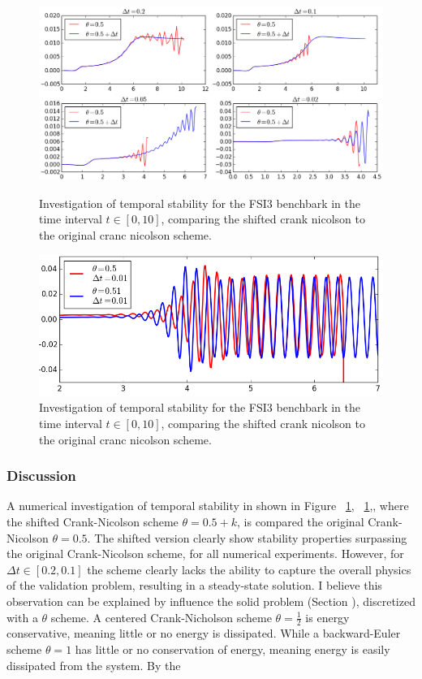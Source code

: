 \begin{figure}[h!]
 	\centering
    \includegraphics[scale=0.6]{./Fig/thetacheck.png} \\
      \caption{Investigation of temporal stability for the FSI3 benchbark in the time interval $t \in [0, 10]$, comparing the shifted crank nicolson to the original cranc nicolson scheme. }
\label{fig:cncomp1}
\end{figure}

\newpage

\begin{figure}[h!]
 	\centering
    \includegraphics[scale=0.6]{./Fig/besttheta.png}
      \caption{Investigation of temporal stability for the FSI3 benchbark in the time interval $t \in [0, 10]$, comparing the shifted crank nicolson to the original cranc nicolson scheme. }
\label{fig:cncomp2}
\end{figure}

\subsubsection*{Discussion}

A numerical investigation of temporal stability in shown in Figure ~\ref{fig:cncomp1}, ~\ref{fig:cncomp1},, where the shifted Crank-Nicolson  scheme $\theta = 0.5 + k$, is compared the original Crank-Nicolson $\theta = 0.5$. The shifted version clearly show stability properties surpassing the original Crank-Nicolson  scheme, for all numerical experiments. However, for $\Delta t \in [0.2, 0.1]$ the scheme clearly lacks the ability to capture the overall physics of the validation problem, resulting in a steady-state solution. I believe this observation can be explained by influence the solid problem (Section \label{sec:solprob}), discretized with a $\theta$ scheme. A centered Crank-Nicholson scheme $\theta= \frac{1}{2}$ is energy conservative, meaning little or no energy is dissipated. While a backward-Euler scheme $\theta = 1$  has little or no conservation of energy, meaning energy is easily dissipated from the system. By the 


